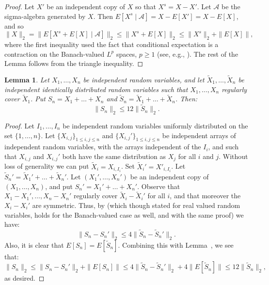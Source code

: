 \documentclass[12pt]{amsart}
\def\Cal{\mathcal}
\def\upref#1{\upn{\ref{#1}}}
\theoremstyle{definition}
\theoremstyle{plain}
\newtheorem{lem}{Lemma}
\theoremstyle{remark}
\begin{document}
\begin{proof}
Let $X'$ be an independent copy of $X$ so that $X^s=X-X'$.
Let $\Cal A$ be the sigma-algebra generated by $X$.
Then $E[X^s\mid\Cal A] = X-E[X']=X-E[X]$, and so
\[
\|X\|_2 = \| E[X^s+E[X]\mid \Cal A] \|_2
  \le \| X^s+E[X] \|_2
  \le \| X^s \|_2 + \| E[X] \|,
\]
where the first inequality used the fact that conditional expectation is
a contraction on the Banach-valued $L^p$ spaces, $p\ge 1$ (see, e.g.,
\cite[Chapter V, Theorem~4]{DiestelUhl}).
The rest of the Lemma follows from the triangle inequality.
\end{proof}

\begin{lem}\label{lem:comp-moment}
Let $X_1,\dots,X_n$ be independent random variables, and let
$\tilde X_1,\dots,\tilde X_n$ be independent identically distributed
random variables such that $X_1,\dots,X_n$ regularly cover $\tilde X_1$.
Put $S_n=X_1+\dots+X_n$ and $\tilde S_n=\tilde X_1+\dots+\tilde X_n$.
Then:
\[
         \| S_n \|_2 \le 12  \| \tilde S_n \|_2.
\]

\end{lem}

\begin{proof}  Let $I_1,\dots,I_n$ be independent random variables
uniformly distributed on the set $\{ 1,\dots,n \}$.  Let $\{ X_{i,j}
\}_{1\le i,j\le n}$ and $\{ X_{i,j}' \}_{1\le i,j\le n}$ be independent
arrays of independent random variables, with the arrays independent of
the $I_i$, and such that $X_{i,j}$ and $X_{i,j}'$ both have the same
distribution as $X_j$ for all $i$ and $j$.  Without loss of generality
we can put $\tilde X_i=X_{i,I_i}$.  Set $\tilde X_i'=X'_{i,I_i}$.
Let $\tilde S_n'=\tilde X_1'+\dots+\tilde X_n'$.  Let
$(X_1',\dots,X_n')$ be an independent copy of $(X_1,\dots,X_n)$, and put
$S_n'=X_1'+\dots+X_n'$.  Observe that $X_1-X_1',\dots,X_n-X_n'$
regularly cover $\tilde X_i-\tilde X_i'$ for all $i$, and that moreover
the $X_i-X_i'$ are symmetric.  Thus, by
\cite[Proposition~1]{Pruss:noniid} (which though stated for real valued
random variables, holds for the Banach-valued
case as well, and with the same proof) we have:
\begin{equation}\label{eq:moment-1}
        \| S_n-S_n' \|_2 \le 4 \| \tilde S_n-\tilde S_n' \|_2.
\end{equation}
Also, it is clear that $E[S_n] = E[\tilde S_n]$.
Combining this with Lemma~\upref{lem:disymm2}, we see that:
\[
     \| S_n \|_2 \le \| S_n-S_n' \|_2 + \| E[S_n] \|
     \le 4 \| \tilde S_n -\tilde S_n'\|_2 + 4 \|
     E[\tilde S_n] \|
     \le 12 \| \tilde S_n \|_2 ,
\]
as desired.
\end{proof}
\end{document}
